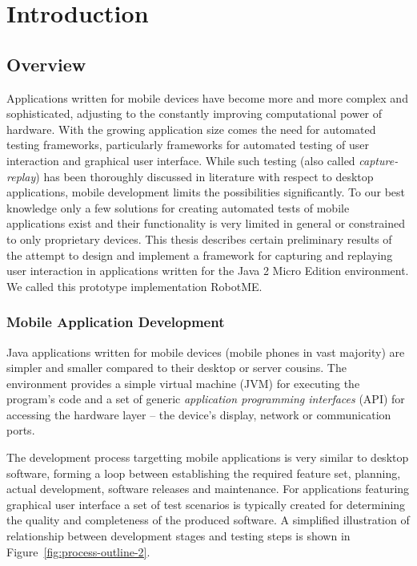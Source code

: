 
\chapter{Introduction}


\section{Overview}

Applications written for mobile devices have become more and more complex and sophisticated, adjusting to the
constantly improving computational power of hardware. With the growing application size comes the
need for automated testing frameworks, particularly frameworks for automated testing of user
interaction and graphical user interface. While such testing (also called
\emph{capture-replay}) has been thoroughly discussed in literature with respect to desktop
applications, mobile development limits the possibilities significantly. To our best knowledge only
a few solutions for creating automated tests of mobile applications exist and their functionality
is very limited in general or constrained to only proprietary devices. 
This thesis describes certain preliminary results of the attempt to design and implement a
framework for capturing and replaying user interaction in applications written for the Java 2 Micro
Edition environment. We called this prototype implementation \textsf{RobotME}.

\subsection{Mobile Application Development}


Java applications written for mobile devices (mobile phones in vast majority) are simpler and
smaller compared to their desktop or server cousins. The environment provides a simple virtual machine (JVM) for
executing the program's code and a set of generic \emph{application programming interfaces} (API)
for accessing the hardware layer -- the device's display, network or communication ports.

The development process targetting mobile applications is very similar to desktop software,
forming a loop between establishing the required feature set, planning,
actual development, software releases and maintenance. For applications featuring graphical user interface
a set of test scenarios is typically created for determining the quality and completeness of the 
produced software. A simplified illustration of relationship between development stages and testing
steps is shown in Figure~\ref{fig:process-outline-2}.

